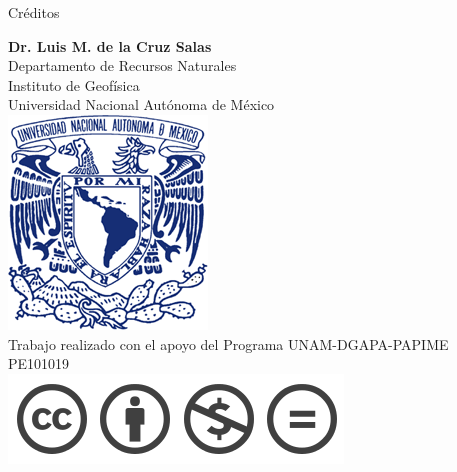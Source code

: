 \documentclass{beamer}
\begin{document}
\begin{frame}{Créditos}
	
	\begin{center}
		\textbf{Dr. Luis M. de la Cruz Salas} \\
		\vspace{0.5cm}
		{\small{Departamento de Recursos Naturales}} \\
		\vspace{0.15cm}
		{\small{Instituto de Geof\'isica}} \\ 
		\vspace{0.15cm}
		{\small{Universidad Nacional Aut\'onoma de M\'exico}} \\
		\vspace{0.15cm}
		\includegraphics[height=.85cm]{unamlogo.png} \\
		\vspace{1.15cm}
		{\scriptsize{Trabajo realizado con el apoyo del Programa UNAM-DGAPA-PAPIME PE101019 \\		
				\includegraphics[scale=0.20]{ccPyNoxtli.png} }}
	\end{center}
	
\end{frame}
\end{document}

